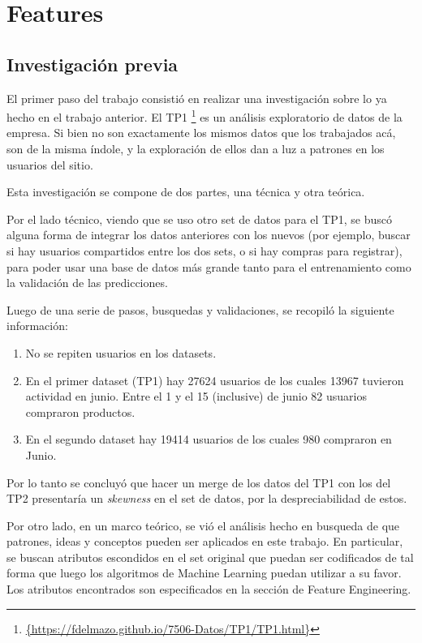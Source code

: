 \documentclass[a4paper]{article}
\begin{document}
\section{Features}
\subsection{Investigación previa}

El primer paso del trabajo consistió en realizar una investigación sobre lo ya hecho en el trabajo anterior. El TP1 \footnote{\url{{https://fdelmazo.github.io/7506-Datos/TP1/TP1.html}}} es un análisis exploratorio de datos de la empresa. Si bien no son exactamente los mismos datos que los trabajados acá, son de la misma índole, y la exploración de ellos dan a luz a patrones en los usuarios del sitio.

Esta investigación se compone de dos partes, una técnica y otra teórica.

Por el lado técnico, viendo que se uso otro set de datos para el TP1, se buscó alguna forma de integrar los datos anteriores con los nuevos (por ejemplo, buscar si hay usuarios compartidos entre los dos sets, o si hay compras para registrar), para poder usar una base de datos más grande tanto para el entrenamiento como la validación de las predicciones. 

Luego de una serie de pasos, busquedas y validaciones, se recopiló la siguiente información:
\begin{enumerate}
\item No se repiten usuarios en los datasets.
\item En el primer dataset (TP1) hay 27624 usuarios de los cuales 13967 tuvieron actividad en junio. Entre el 1 y el 15 (inclusive) de junio 82 usuarios compraron productos.
\item En el segundo dataset hay 19414 usuarios de los cuales 980 compraron en Junio.
\end{enumerate}

Por lo tanto se concluyó que hacer un merge de los datos del TP1 con los del TP2 presentaría un \textit{skewness} en el set de datos, por la despreciabilidad de estos.

Por otro lado, en un marco teórico, se vió el análisis hecho en busqueda de que patrones, ideas y conceptos pueden ser aplicados en este trabajo. En particular, se buscan atributos escondidos en el set original que puedan ser codificados de tal forma que luego los algoritmos de Machine Learning puedan utilizar a su favor. Los atributos encontrados son especificados en la sección de Feature Engineering.
\end{document}
